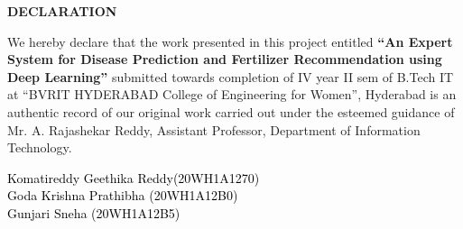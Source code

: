 \documentclass[12pt, English]{article}
\begin{document}
\newcommand{\CC}{C\nolinebreak\hspace{-.05em}\raisebox{.4ex}{\tiny\bf +}\nolinebreak\hspace{-.10em}\raisebox{.4ex}{\tiny\bf +}}
\def\CC{{C\nolinebreak[4]\hspace{-.05em}\raisebox{.4ex}{\tiny\bf ++}}}
\begin{titlepage}
\begin{center}
    \textbf{\LARGE DECLARATION}\\
\end{center}
\vspace*{0.2in}

We hereby declare that the work presented in this project entitled {\textbf{“An Expert System for Disease Prediction and Fertilizer Recommendation using Deep Learning”}} submitted towards completion of IV year II sem of B.Tech IT at “BVRIT HYDERABAD College of Engineering for Women”, Hyderabad is an authentic record of our original work carried out under the esteemed guidance of {Mr. A. Rajashekar Reddy, Assistant Professor}, Department of Information Technology.


\raggedleft
\vspace*{0.5in}

\textcolor{black}{Komatireddy Geethika Reddy(20WH1A1270)}\\
\raggedleft
\vspace*{0.3in}
\textcolor{black}{Goda Krishna Prathibha (20WH1A12B0)}\\
\raggedleft
\vspace*{0.3in}
\textcolor{black}{Gunjari Sneha (20WH1A12B5)}\\
\raggedleft


\end{titlepage}
\end{document}
